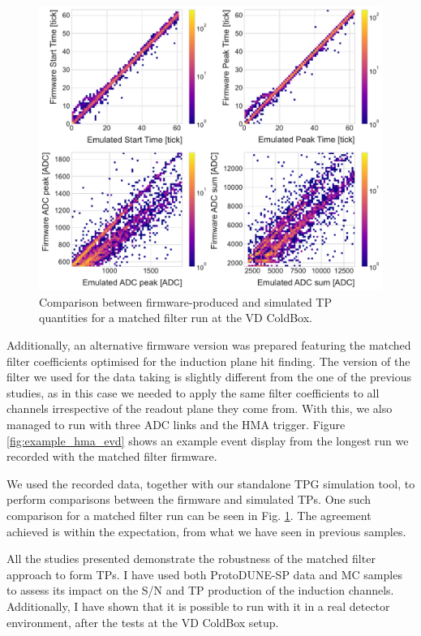 \begin{figure}[t]
    \centering
    \includegraphics[scale = 0.5]{Images/Matched_Filter/np02_coldbox_tp_comp.pdf}
    \caption[Comparison between firmware-produced and simulated TP quantities for a matched filter run at the VD ColdBox.]{Comparison between firmware-produced and simulated TP quantities for a matched filter run at the VD ColdBox.}
    \label{fig:vdcoldbox_tp_comp}
\end{figure}

Additionally, an alternative firmware version was prepared featuring the matched filter coefficients optimised for the induction plane hit finding. The version of the filter we used for the data taking is slightly different from the one of the previous studies, as in this case we needed to apply the same filter coefficients to all channels irrespective of the readout plane they come from. With this, we also managed to run with three ADC links and the HMA trigger. Figure \ref{fig:example_hma_evd} shows an example event display from the longest run we recorded with the matched filter firmware.

We used the recorded data, together with our standalone TPG simulation tool, to perform comparisons between the firmware and simulated TPs. One such comparison for a matched filter run can be seen in Fig. \ref{fig:vdcoldbox_tp_comp}. The agreement achieved is within the expectation, from what we have seen in previous samples.

All the studies presented demonstrate the robustness of the matched filter approach to form TPs. I have used both ProtoDUNE-SP data and MC samples to assess its impact on the S/N and TP production of the induction channels. Additionally, I have shown that it is possible to run with it in a real detector environment, after the tests at the VD ColdBox setup.